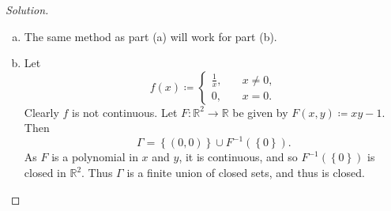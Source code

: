 \documentclass[12pt]{article}
\newcommand{\real}{\mathbb{R}}
\newcommand\inv[1]{#1^{-1}}
\newcommand\paren[1]{\left( #1 \right)}
\newcommand\setb[1]{\left \{ #1 \right \}}
\theoremstyle{definition}
\begin{document}
\begin{proof}[Solution]
\begin{enumerate}[(a)]
\begin{proof}
            \[
                W \coloneqq \bigcup\limits_{i = 1}^n U_i.
            \]
            Then $W$ is an open neighborhood of $x_0$. Lastly, we show that $\setb{ U_i \times V_i }_{i = 1}^n$ covers $W \times Y$. Let $(x,y) \in W \times Y$, then $x \in U_i$ for all $1 \leq i \leq n$. Furthermore, as $\setb{ U_i \times V_i }_{i = 1}^n$ covers $\setb{ x_0 } \times Y$, $y$ will be contained in some $V_j$ for some $1 \leq j \leq n$. Thus $(x,y) \in U_j \times V_j$, and so \[
                W \times Y \subseteq \bigcup\limits_{i = 1}^n U_i \times V_i.
            \]
            Since $U_i \times V_i \subseteq N$ for all $1 \leq i \leq n$, $W \times Y \subseteq N$ as desired.
        \end{proof}
        Let $C \subseteq [0,1]^2$ be closed. We show that $[0,1] \setminus \pi(C) \subseteq [0,1]$ is open. Let $x_0 \in [0,1] \setminus \pi(C)$, then $\setb{ x_0 } \times [0,1]$ is disjoint from $C$, and so $[0,1]^2 \setminus C$ is an open subset of $[0,1]^2$ that contains $\setb{ x_0 } \times [0,1]$. By the Tube Lemma, there exists an open neighborhood $W$ of $x_0$ such that $\setb{ x_0 } \times [0,1] \subseteq W \times [0,1] \subseteq [0,1]^2 \setminus C$. Since $W \times [0,1] \subseteq [0,1]^2 \setminus C$, $W$ must be disjoint from $\pi(C)$, and so $x_0 \in W \subseteq [0,1] \setminus \pi(C)$. Therefore $[0,1] \setminus \pi(C)$ is open.
        \item The same method as part (a) will work for part (b).
        \item Let 
        \[
            f(x) \coloneqq 
            \begin{cases}
                \frac{1}{x} , & \quad x \neq 0 , \\
                0 , & \quad x = 0.
            \end{cases}
        \]
        Clearly $f$ is not continuous. Let $F : \real^2 \to \real$ be given by $F(x,y) \coloneqq xy - 1$. Then 
        \[
            \Gamma = \setb{ (0,0) } \cup \inv{F} \paren{ \setb{ 0 } }.
        \]
        As $F$ is a polynomial in $x$ and $y$, it is continuous, and so $\inv{F} \paren{ \setb{ 0 } }$ is closed in $\real^2$. Thus $\Gamma$ is a finite union of closed sets, and thus is closed.
    \end{enumerate}
\end{proof}
\end{document}
